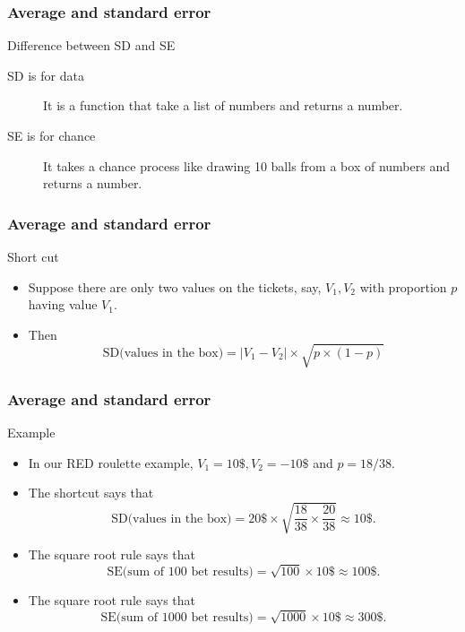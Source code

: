 \documentclass[handout]{beamer}
\begin{document}

   \begin{frame} \frametitle{Average and standard error}

   \begin{block}
   {Difference between SD and SE}
   \begin{description}
   \item[SD is for data] It is
     a function that take a list of numbers
   and returns a number.

   \item[SE is for chance] It takes a chance process like drawing 10 balls
     from a box of numbers and returns a number.
   \end{description}
   \end{block}
   \end{frame}


   \begin{frame} \frametitle{Average and standard error}

   \begin{block}
   {Short cut}
   \begin{itemize}
   \item Suppose there are only two values on the tickets, say, $V_1, V_2$
   with proportion $p$ having value $V_1$.
   \item Then
   $$
   \text{SD(values in the box)} = |V_1-V_2| \times \sqrt{p \times (1-p)}
   $$
   \end{itemize}
   \end{block}
   \end{frame}


   \begin{frame} \frametitle{Average and standard error}

   \begin{block}
   {Example}
   \begin{itemize}
   \item In our {\color{red} RED} roulette example, $V_1=10 \$, V_2=-10\$ $ and $p=18/38$.
   \item The shortcut says that
   $$
   \text{SD(values in the box)} = 20 \$ \times \sqrt{\frac{18}{38} \times \frac{20}{38}} \approx 10\$.
   $$
   \item The square root rule says that
   $$
   \text{SE(sum of 100 bet results)} = \sqrt{100} \times 10\$ \approx 100\$.
   $$

   \item The square root rule says that
   $$
   \text{SE(sum of 1000 bet results)} = \sqrt{1000} \times 10\$ \approx 300\$.
   $$
   \end{itemize}
   \end{block}
   \end{frame}
\end{document}
